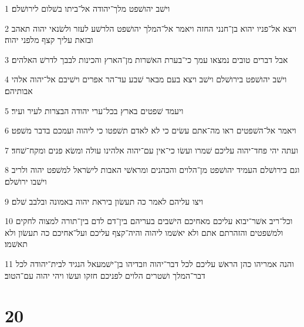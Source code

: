 \par 1 וישׁב יהושׁפט מלך־יהודה אל־ביתו בשׁלום לירושׁלם׃
\par 2 ויצא אל־פניו יהוא בן־חנני החזה ויאמר אל־המלך יהושׁפט הלרשׁע לעזר ולשׂנאי יהוה תאהב ובזאת עליך קצף מלפני יהוה׃
\par 3 אבל דברים טובים נמצאו עמך כי־בערת האשׁרות מן־הארץ והכינות לבבך לדרשׁ האלהים׃
\par 4 וישׁב יהושׁפט בירושׁלם וישׁב ויצא בעם מבאר שׁבע עד־הר אפרים וישׁיבם אל־יהוה אלהי אבותיהם׃
\par 5 ויעמד שׁפטים בארץ בכל־ערי יהודה הבצרות לעיר ועיר׃
\par 6 ויאמר אל־השׁפטים ראו מה־אתם עשׂים כי לא לאדם תשׁפטו כי ליהוה ועמכם בדבר משׁפט׃
\par 7 ועתה יהי פחד־יהוה עליכם שׁמרו ועשׂו כי־אין עם־יהוה אלהינו עולה ומשׂא פנים ומקח־שׁחד׃
\par 8 וגם בירושׁלם העמיד יהושׁפט מן־הלוים והכהנים ומראשׁי האבות לישׂראל למשׁפט יהוה ולריב וישׁבו ירושׁלם׃
\par 9 ויצו עליהם לאמר כה תעשׂון ביראת יהוה באמונה ובלבב שׁלם׃
\par 10 וכל־ריב אשׁר־יבוא עליכם מאחיכם הישׁבים בעריהם בין־דם לדם בין־תורה למצוה לחקים ולמשׁפטים והזהרתם אתם ולא יאשׁמו ליהוה והיה־קצף עליכם ועל־אחיכם כה תעשׂון ולא תאשׁמו׃
\par 11 והנה אמריהו כהן הראשׁ עליכם לכל דבר־יהוה וזבדיהו בן־ישׁמעאל הנגיד לבית־יהודה לכל דבר־המלך ושׁטרים הלוים לפניכם חזקו ועשׂו ויהי יהוה עם־הטוב׃

\chapter{20}

